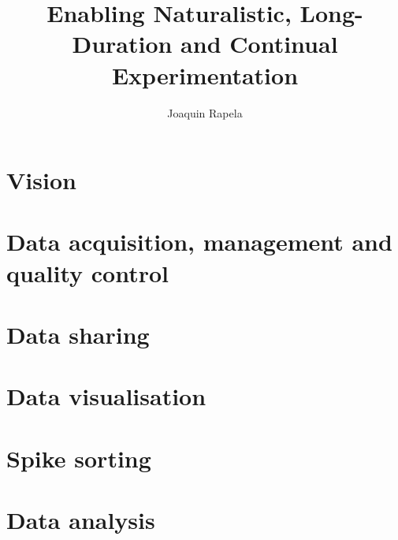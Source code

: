 \documentclass[12pt]{article}
\title{Enabling Naturalistic, Long-Duration and Continual Experimentation}
\author{Joaquin Rapela}
\begin{document}
\maketitle

\tableofcontents

\pagebreak

\section{Vision}



\pagebreak

\section{Data acquisition, management and quality control}


\pagebreak

\begin{comment}
\section{Intelligent experimental control}


\pagebreak

\end{comment}

\pagebreak

\section{Data sharing}


\pagebreak

\section{Data visualisation}


\pagebreak

\section{Spike sorting}


\pagebreak

\section{Data analysis}


\pagebreak



\end{document}
